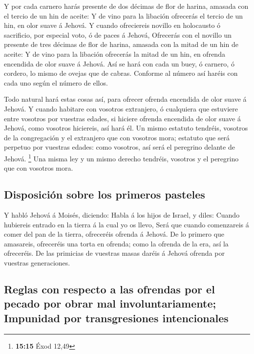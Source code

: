 Y por cada carnero harás presente de dos décimas de flor de
harina, amasada con el tercio de un hin de aceite:  Y de
vino para la libación ofrecerás el tercio de un hin, en olor suave á
Jehová.  Y cuando ofreciereis novillo en holocausto ó
sacrificio, por especial voto, ó de paces á Jehová, 
Ofrecerás con el novillo un presente de tres décimas de flor de harina,
amasada con la mitad de un hin de aceite:  Y de vino para
la libación ofrecerás la mitad de un hin, en ofrenda encendida de olor
suave á Jehová.  Así se hará con cada un buey, ó carnero, ó
cordero, lo mismo de ovejas que de cabras.  Conforme al
número así haréis con cada uno según el número de ellos.

 Todo natural hará estas cosas así, para ofrecer ofrenda
encendida de olor suave á Jehová.  Y cuando habitare con
vosotros extranjero, ó cualquiera que estuviere entre vosotros por
vuestras edades, si hiciere ofrenda encendida de olor suave á Jehová,
como vosotros hiciereis, así hará él.  Un mismo estatuto
tendréis, vosotros de la congregación y el extranjero que con vosotros
mora; estatuto que será perpetuo por vuestras edades: como vosotros, así
será el peregrino delante de Jehová. \footnote{\textbf{15:15} Éxod 12,49}
 Una misma ley y un mismo derecho tendréis, vosotros y el
peregrino que con vosotros mora.

\hypertarget{disposiciuxf3n-sobre-los-primeros-pasteles}{%
\subsection{Disposición sobre los primeros
pasteles}\label{disposiciuxf3n-sobre-los-primeros-pasteles}}

 Y habló Jehová á Moisés, diciendo:  Habla á
los hijos de Israel, y diles: Cuando hubiereis entrado en la tierra á la
cual yo os llevo,  Será que cuando comenzareis á comer del
pan de la tierra, ofreceréis ofrenda á Jehová.  De lo
primero que amasareis, ofreceréis una torta en ofrenda; como la ofrenda
de la era, así la ofreceréis.  De las primicias de vuestras
masas daréis á Jehová ofrenda por vuestras generaciones.

\hypertarget{reglas-con-respecto-a-las-ofrendas-por-el-pecado-por-obrar-mal-involuntariamente-impunidad-por-transgresiones-intencionales}{%
\subsection{Reglas con respecto a las ofrendas por el pecado por obrar
mal involuntariamente; Impunidad por transgresiones
intencionales}\label{reglas-con-respecto-a-las-ofrendas-por-el-pecado-por-obrar-mal-involuntariamente-impunidad-por-transgresiones-intencionales}}

